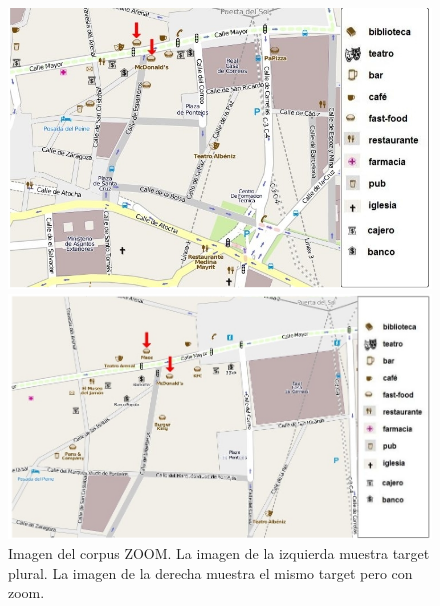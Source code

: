 \begin{figure}
\begin{minipage}[b]{0.48\linewidth}
\centering
\includegraphics[width=\textwidth]{images/corpus/mapa8.png}
\caption{}
\label{mapa7}
\end{minipage}
\hspace*{0cm}
\begin{minipage}[b]{0.55\linewidth}
\centering
\includegraphics[width=\textwidth]{images/corpus/mapa18.png}
\caption{}
\label{mapa8}
\end{minipage}
\caption{Imagen del corpus ZOOM. La imagen de la izquierda muestra target plural. La imagen de la derecha muestra el mismo target pero con zoom.}
\end{figure}


